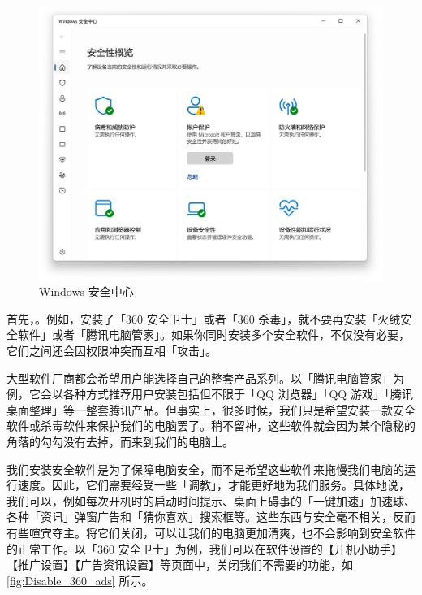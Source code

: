 \begin{figure}[htb!]
  \centering
  \includegraphics[width=.8\textwidth]{assets/basic/Windows_Security.png}
  \caption{Windows 安全中心}
  \label{fig:Windows_Security}
\end{figure}

首先，。例如，安装了「360 安全卫士」或者「360 杀毒」，就不要再安装「火绒安全软件」或者「腾讯电脑管家」。如果你同时安装多个安全软件，不仅没有必要，它们之间还会因权限冲突而互相「攻击」。

大型软件厂商都会希望用户能选择自己的整套产品系列。以「腾讯电脑管家」为例，它会以各种方式推荐用户安装包括但不限于「QQ 浏览器」「QQ 游戏」「腾讯桌面整理」等一整套腾讯产品。但事实上，很多时候，我们只是希望安装一款安全软件或杀毒软件来保护我们的电脑罢了。稍不留神，这些软件就会因为某个隐秘的角落的勾勾没有去掉，而来到我们的电脑上。

我们安装安全软件是为了保障电脑安全，而不是希望这些软件来拖慢我们电脑的运行速度。因此，它们需要经受一些「调教」，才能更好地为我们服务。具体地说，我们可以，例如每次开机时的启动时间提示、桌面上碍事的「一键加速」加速球、各种「资讯」弹窗广告和「猜你喜欢」搜索框等。这些东西与安全毫不相关，反而有些喧宾夺主。将它们关闭，可以让我们的电脑更加清爽，也不会影响到安全软件的正常工作。以「360 安全卫士」为例，我们可以在软件设置的【开机小助手】【推广设置】【广告资讯设置】等页面中，关闭我们不需要的功能，如\autoref{fig:Disable_360_ads} 所示。

